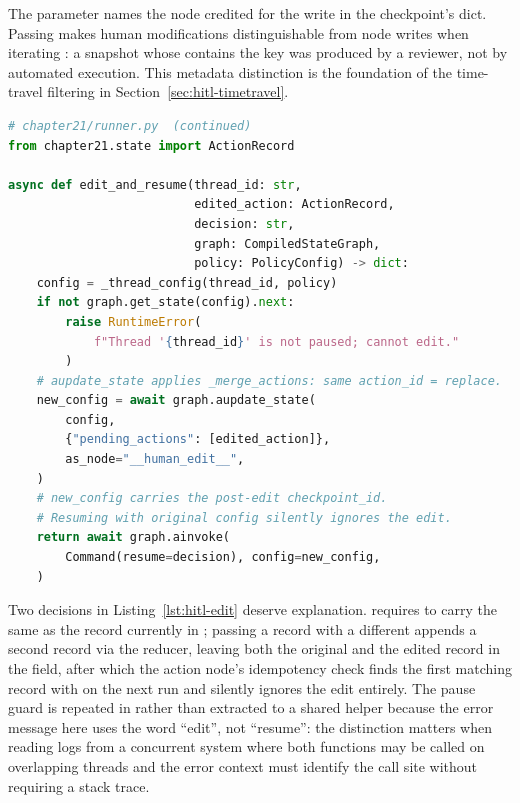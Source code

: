 The  parameter names the node credited for the write in the
checkpoint's  dict. Passing
 makes human modifications
distinguishable from node writes when iterating :
a snapshot whose  contains the key
 was produced by a reviewer, not by automated
execution. This metadata distinction is the foundation of the time-travel
filtering in Section~\ref{sec:hitl-timetravel}.

\begin{lstlisting}[language=Python,
  caption={Edit state at the breakpoint then resume from the post-edit
           checkpoint},
  label={lst:hitl-edit}]
# chapter21/runner.py  (continued)
from chapter21.state import ActionRecord

async def edit_and_resume(thread_id: str,
                          edited_action: ActionRecord,
                          decision: str,
                          graph: CompiledStateGraph,
                          policy: PolicyConfig) -> dict:
    config = _thread_config(thread_id, policy)
    if not graph.get_state(config).next:
        raise RuntimeError(
            f"Thread '{thread_id}' is not paused; cannot edit."
        )
    # aupdate_state applies _merge_actions: same action_id = replace.
    new_config = await graph.aupdate_state(
        config,
        {"pending_actions": [edited_action]},
        as_node="__human_edit__",
    )
    # new_config carries the post-edit checkpoint_id.
    # Resuming with original config silently ignores the edit.
    return await graph.ainvoke(
        Command(resume=decision), config=new_config,
    )
\end{lstlisting}

Two decisions in Listing~\ref{lst:hitl-edit} deserve explanation.
 requires  to carry the same
 as the record currently in ;
passing a record with a different  appends a second record
via the  reducer, leaving both the original and the
edited record in the field, after which the action node's idempotency check
finds the first matching record with  on the next
run and silently ignores the edit entirely. The pause guard is repeated in
 rather than extracted to a shared helper because
the error message here uses the word ``edit'', not ``resume'': the
distinction matters when reading logs from a concurrent system where both
functions may be called on overlapping threads and the error context must
identify the call site without requiring a stack trace.

